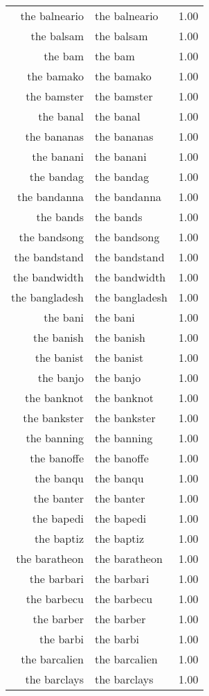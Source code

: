 \begin{table}[ht]
\begin{tabular}{rlr}
  the balneario & the balneario & 1.00 \\ 
  the balsam & the balsam & 1.00 \\ 
  the bam & the bam & 1.00 \\ 
  the bamako & the bamako & 1.00 \\ 
  the bamster & the bamster & 1.00 \\ 
  the banal & the banal & 1.00 \\ 
  the bananas & the bananas & 1.00 \\ 
  the banani & the banani & 1.00 \\ 
  the bandag & the bandag & 1.00 \\ 
  the bandanna & the bandanna & 1.00 \\ 
  the bands & the bands & 1.00 \\ 
  the bandsong & the bandsong & 1.00 \\ 
  the bandstand & the bandstand & 1.00 \\ 
  the bandwidth & the bandwidth & 1.00 \\ 
  the bangladesh & the bangladesh & 1.00 \\ 
  the bani & the bani & 1.00 \\ 
  the banish & the banish & 1.00 \\ 
  the banist & the banist & 1.00 \\ 
  the banjo & the banjo & 1.00 \\ 
  the banknot & the banknot & 1.00 \\ 
  the bankster & the bankster & 1.00 \\ 
  the banning & the banning & 1.00 \\ 
  the banoffe & the banoffe & 1.00 \\ 
  the banqu & the banqu & 1.00 \\ 
  the banter & the banter & 1.00 \\ 
  the bapedi & the bapedi & 1.00 \\ 
  the baptiz & the baptiz & 1.00 \\ 
  the baratheon & the baratheon & 1.00 \\ 
  the barbari & the barbari & 1.00 \\ 
  the barbecu & the barbecu & 1.00 \\ 
  the barber & the barber & 1.00 \\ 
  the barbi & the barbi & 1.00 \\ 
  the barcalien & the barcalien & 1.00 \\ 
  the barclays & the barclays & 1.00 \\ 

\end{tabular}
\end{table}
